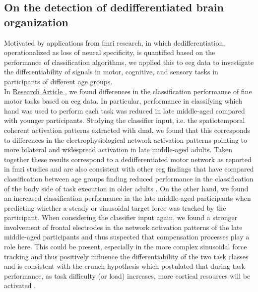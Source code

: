 \subsection{On the detection of dedifferentiated brain organization}
Motivated by applications from \gls{fmri} research, in which dedifferentiation, operationalized as loss of neural specificity, is quantified based on the performance of classification algorithms, we applied this to \gls{eeg} data to investigate the differentiability of signals in motor, cognitive, and sensory tasks in participants of different age groups.\\
In \hyperref[results:paperI]{Research Article }, we found differences in the classification performance of fine motor tasks based on \gls{eeg} data. In particular, performance in classifying which hand was used to perform each task was reduced in late middle-aged compared with younger participants. Studying the classifier input, i.e. the spatiotemporal coherent activation patterns extracted with \gls{dmd}, we found that this corresponds to differences in the electrophysiological network activation patterns pointing to more bilateral and widespread activation in late middle-aged adults. Taken together these results correspond to a dedifferentiated motor network as reported in \gls{fmri} studies \cite{Carb2011,Cassedy2020} and are also consistent with other \gls{eeg} findings that have compared classification between age groups finding reduced performance in the classification of the body side of task execution in older adults \cite{Chen2019, Zich2015}. On the other hand, we found an increased classification performance in the late middle-aged participants when predicting whether a steady or sinusoidal target force was tracked by the participant. When considering the classifier input again, we found a stronger involvement of frontal electrodes in the network activation patterns of the late middle-aged participants and thus suspected that compensation processes play a role here. This could be present,  especially in the more complex sinusoidal force tracking and thus positively influence the differentiability of the two task classes and is consistent with the \gls{crunch} hypothesis which  postulated that during task performance, as task difficulty (or load) increases, more cortical resources will be activated \cite{Festini2018}.\\ 
